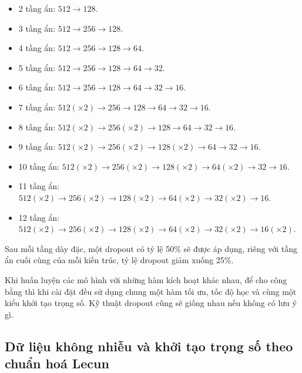 \begin{itemize}
    \item 2 tầng ẩn: $512 \rightarrow 128$.
    \item 3 tầng ẩn: $512 \rightarrow 256 \rightarrow 128$.
    \item 4 tầng ẩn: $512 \rightarrow 256 \rightarrow 128 \rightarrow 64$.
    \item 5 tầng ẩn: $512 \rightarrow 256 \rightarrow 128 \rightarrow 64 \rightarrow 32$.
    \item 6 tầng ẩn: $512 \rightarrow 256 \rightarrow 128 \rightarrow 64 \rightarrow 32 \rightarrow 16$.
    \item 7 tầng ẩn: $512(\times 2) \rightarrow 256 \rightarrow 128 \rightarrow 64 \rightarrow 32 \rightarrow 16$.
    \item 8 tầng ẩn: $512(\times 2) \rightarrow 256(\times 2) \rightarrow 128 \rightarrow 64 \rightarrow 32 \rightarrow 16$.
    \item 9 tầng ẩn: $512(\times 2) \rightarrow 256(\times 2) \rightarrow 128(\times 2) \rightarrow 64 \rightarrow 32 \rightarrow 16$.
    \item 10 tầng ẩn: $512(\times 2) \rightarrow 256(\times 2) \rightarrow 128(\times 2) \rightarrow 64(\times 2) \rightarrow 32 \rightarrow 16$.
    \item 11 tầng ẩn: $512(\times 2) \rightarrow 256(\times 2) \rightarrow 128(\times 2) \rightarrow 64(\times 2) \rightarrow 32(\times 2) \rightarrow 16$.
    \item 12 tầng ẩn: $512(\times 2) \rightarrow 256(\times 2) \rightarrow 128(\times 2) \rightarrow 64(\times 2) \rightarrow 32(\times 2) \rightarrow 16(\times 2)$.
\end{itemize}

Sau mỗi tầng dày đặc, một dropout có tỷ lệ 50\% sẽ được áp dụng, riêng với tầng ẩn cuối cùng của mỗi kiến trúc, tỷ lệ dropout giảm xuống 25\%.
\vspace{5pt}

Khi huấn luyện các mô hình với những hàm kích hoạt khác nhau, để cho công bằng thì khi cài đặt đều sử dụng chung một hàm tối ưu, tốc độ học và cùng một kiểu khởi tạo trọng số.
Kỹ thuật dropout cũng sẽ giống nhau nếu không có lưu ý gì.

\subsection{Dữ liệu không nhiễu và khởi tạo trọng số theo chuẩn hoá Lecun}\label{subsec:mnistd}

